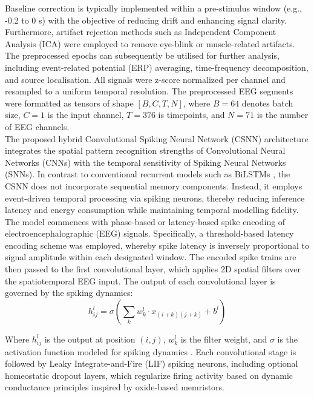 \noindent Baseline correction is typically implemented within a pre-stimulus window (e.g., -0.2 to 0 s) with the objective of reducing drift and enhancing signal clarity. Furthermore, artifact rejection methods such as Independent Component Analysis (ICA) were employed to remove eye-blink or muscle-related artifacts. \\

\noindent The preprocessed epochs can subsequently be utilised for further analysis, including event-related potential (ERP) averaging, time-frequency decomposition, and source localisation. All signals were z-score normalized per channel and resampled to a uniform temporal resolution. The preprocessed EEG segments were formatted as tensors of shape $[B,C,T,N]$, where $B=64$ denotes batch size, $C=1$ is the input channel, $T=376$ is timepoints, and $N=71$ is the number of EEG channels.\\

\noindent The proposed hybrid Convolutional Spiking Neural Network (CSNN) architecture integrates the spatial pattern recognition strengths of Convolutional Neural Networks (CNNs) with the temporal sensitivity of Spiking Neural Networks (SNNs). In contrast to conventional recurrent models such as BiLSTMs \cite{malviya2022novel}, the CSNN does not incorporate sequential memory components. Instead, it employs event-driven temporal processing via spiking neurons, thereby reducing inference latency and energy consumption while maintaining temporal modelling fidelity. \\

\noindent The model commences with phase-based or latency-based spike encoding of electroencephalographic (EEG) signals. Specifically, a threshold-based latency encoding scheme was employed, whereby spike latency is inversely proportional to signal amplitude within each designated window. The encoded spike trains are then passed to the first convolutional layer, which applies 2D spatial filters over the spatiotemporal EEG input. The output of each convolutional layer is governed by the spiking dynamics:
\begin{equation} h_{ij}^{l} = \sigma \left( \sum _{k} w_{k}^{l} \cdot x_{(i+k)(j+k)} + b^{l} \right) \label{eq:7.3}
\end{equation}

\noindent Where $h_{ij}^{l}$ is the output at position $(i,j)$, $ w_{k}^{l}$ is the filter weight, and $\sigma$ is the activation function modeled for spiking dynamics \cite{tavanaei2019deep}. Each convolutional stage is followed by Leaky Integrate-and-Fire (LIF) spiking neurons, including optional homeostatic dropout layers, which regularize firing activity based on dynamic conductance principles inspired by oxide-based memristors.\\

